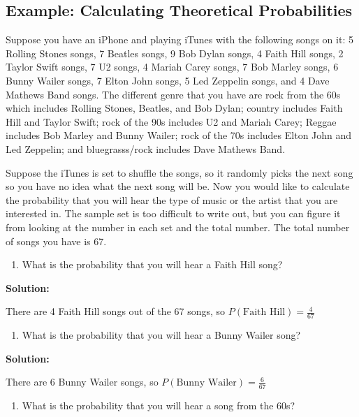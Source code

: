 \documentclass[
]{book}
\providecommand{\tightlist}{%
  \setlength{\itemsep}{0pt}\setlength{\parskip}{0pt}}
\begin{document}
\hypertarget{example-calculating-theoretical-probabilities-2}{%
\subsection{Example: Calculating Theoretical Probabilities}\label{example-calculating-theoretical-probabilities-2}}

Suppose you have an iPhone and playing iTunes with the following songs on it: 5 Rolling Stones songs, 7 Beatles songs, 9 Bob Dylan songs, 4 Faith Hill songs, 2 Taylor Swift songs, 7 U2 songs, 4 Mariah Carey songs, 7 Bob Marley songs, 6 Bunny Wailer songs, 7 Elton John songs, 5 Led Zeppelin songs, and 4 Dave Mathews Band songs. The different genre that you have are rock from the 60s which includes Rolling Stones, Beatles, and Bob Dylan; country includes Faith Hill and Taylor Swift; rock of the 90s includes U2 and Mariah Carey; Reggae includes Bob Marley and Bunny Wailer; rock of the 70s includes Elton John and Led Zeppelin; and bluegrasss/rock includes Dave Mathews Band.

Suppose the iTunes is set to shuffle the songs, so it randomly picks the next song so you have no idea what the next song will be. Now you would like to calculate the probability that you will hear the type of music or the artist that you are interested in. The sample set is too difficult to write out, but you can figure it from looking at the number in each set and the total number. The total number of songs you have is 67.

\begin{enumerate}
\def\labelenumi{\alph{enumi}.}
\tightlist
\item
  What is the probability that you will hear a Faith Hill song?
\end{enumerate}

\textbf{Solution:}

There are 4 Faith Hill songs out of the 67 songs, so \(P(\text{Faith Hill})=\frac{4}{67}\)

\begin{enumerate}
\def\labelenumi{\alph{enumi}.}
\setcounter{enumi}{1}
\tightlist
\item
  What is the probability that you will hear a Bunny Wailer song?
\end{enumerate}

\textbf{Solution:}

There are 6 Bunny Wailer songs, so \(P(\text{Bunny Wailer})=\frac{6}{67}\)

\begin{enumerate}
\def\labelenumi{\alph{enumi}.}
\setcounter{enumi}{2}
\tightlist
\item
  What is the probability that you will hear a song from the 60s?
\end{enumerate}
\end{document}
